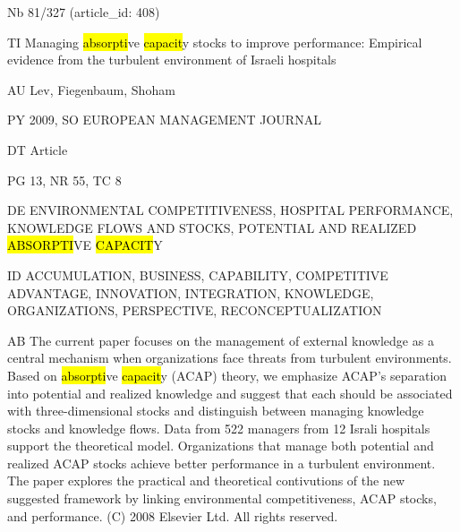 \documentclass[a4paper]{article}
\begin{document}
\vspace*{-2cm}
Nb \tabto{0cm}81/327 (article\_id: 408)\par
TI \tabto{0cm}Managing \hl{absorpti}ve \hl{capacit}y stocks to improve performance: Empirical evidence from the turbulent environment of Israeli hospitals\par
AU \tabto{0cm}Lev, Fiegenbaum, Shoham\par
PY \tabto{0cm}2009, SO EUROPEAN MANAGEMENT JOURNAL\par
DT \tabto{0cm}Article\par
PG \tabto{0cm}13, NR 55, TC 8\par
DE \tabto{0cm}ENVIRONMENTAL COMPETITIVENESS, HOSPITAL PERFORMANCE, KNOWLEDGE FLOWS AND STOCKS, POTENTIAL AND REALIZED \hl{ABSORPTI}VE \hl{CAPACIT}Y\par
ID \tabto{0cm}ACCUMULATION, BUSINESS, CAPABILITY, COMPETITIVE ADVANTAGE, INNOVATION, INTEGRATION, KNOWLEDGE, ORGANIZATIONS, PERSPECTIVE, RECONCEPTUALIZATION\par
AB \tabto{0cm}The current paper focuses on the management of external knowledge as a central mechanism when organizations face threats from turbulent environments. Based on \hl{absorpti}ve \hl{capacit}y (ACAP) theory, we emphasize ACAP's separation into potential and realized knowledge and suggest that each should be associated with three-dimensional stocks and distinguish between managing knowledge stocks and knowledge flows. Data from 522 managers from 12 Israli hospitals support the theoretical model. Organizations that manage both potential and realized ACAP stocks achieve better performance in a turbulent environment. The paper explores the practical and theoretical contivutions of the new suggested framework by linking environmental competitiveness, ACAP stocks, and performance. (C) 2008 Elsevier Ltd. All rights reserved.\par
\clearpage
\end{document}

